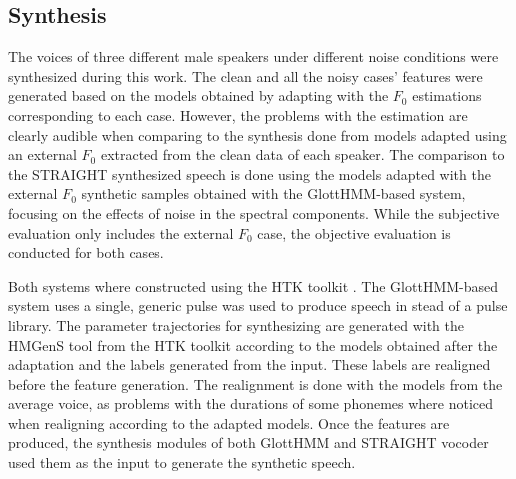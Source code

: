 \subsection{Synthesis}
\label{experiments_synthesis}
The voices of three different male speakers under different noise conditions were synthesized during this work.
%
The clean and all the noisy cases' features were generated based on the models obtained by adapting with the $F_{0}$ estimations corresponding to each case.
%
However, the problems with the estimation are clearly audible when comparing to the synthesis done from models adapted using an external $F_{0}$ extracted from the clean data of each speaker.
%
The comparison to the STRAIGHT synthesized speech is done using the models adapted with the external $F_{0}$ synthetic samples obtained with the GlottHMM-based system, focusing on the effects of noise in the spectral components.
%
While the subjective evaluation only includes the external $F_{0}$ case, the objective evaluation is conducted for both cases.

Both systems where constructed using the HTK toolkit \cite{young1997htk}.
%
The GlottHMM-based system uses a single, generic pulse was used to produce speech in stead of a pulse library.
%
The parameter trajectories for synthesizing are generated with the HMGenS tool from the HTK toolkit according to the models obtained after the adaptation and the labels generated from the input.
%
These labels are realigned before the feature generation.
%
The realignment is done with the models from the average voice, as problems with the durations of some phonemes where noticed when realigning according to the adapted models.
%
Once the features are produced, the synthesis modules of both GlottHMM and STRAIGHT vocoder used them as the input to generate the synthetic speech.